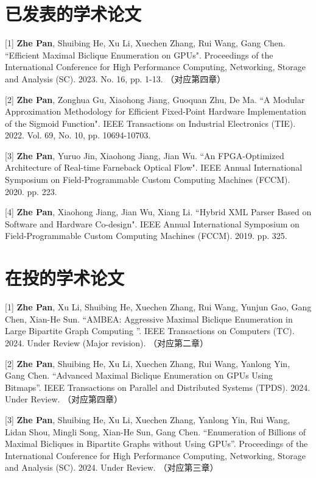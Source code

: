 \cleardoublepage
{}

\section*{已发表的学术论文}

[1] \textbf{Zhe Pan}, Shuibing He, Xu Li, Xuechen Zhang, Rui Wang, Gang Chen. ``Efficient Maximal Biclique Enumeration on GPUs". Proceedings of the International Conference for High Performance Computing, Networking, Storage and Analysis (SC). 2023. No. 16, pp. 1-13. （对应第四章）

[2] \textbf{Zhe Pan}, Zonghua Gu, Xiaohong Jiang, Guoquan Zhu, De Ma. ``A Modular Approximation Methodology for Efficient Fixed-Point Hardware Implementation of the Sigmoid Function". IEEE Transactions on Industrial Electronics (TIE). 2022. Vol. 69, No. 10, pp. 10694-10703.

\begin{sloppypar}
[3] \textbf{Zhe Pan}, Yuruo Jin, Xiaohong Jiang, Jian Wu. ``An FPGA-Optimized Architecture of Real-time Farneback Optical Flow". IEEE Annual International Symposium on Field-Programmable Custom Computing Machines (FCCM). 2020. pp. 223.
\end{sloppypar}


[4] \textbf{Zhe Pan}, Xiaohong Jiang, Jian Wu, Xiang Li. ``Hybrid XML Parser Based on Software and Hardware
Co-design". IEEE Annual International Symposium on Field-Programmable Custom Computing Machines (FCCM). 2019. pp. 325.

\section*{在投的学术论文}

[1] \textbf{Zhe Pan}, Xu Li, Shuibing He, Xuechen Zhang, Rui Wang, Yunjun Gao, Gang Chen, Xian-He Sun. ``AMBEA: Aggressive Maximal Biclique Enumeration in Large Bipartite Graph Computing ''. IEEE Transactions on Computers (TC). 2024. Under Review (Major revision). （对应第二章）

[2] \textbf{Zhe Pan}, Shuibing He, Xu Li, Xuechen Zhang, Rui Wang, Yanlong Yin, Gang Chen. ``Advanced Maximal Biclique Enumeration on GPUs Using Bitmaps''. IEEE Transactions on Parallel and Distributed Systems (TPDS). 2024. Under Review. （对应第四章）

[3] \textbf{Zhe Pan}, Shuibing He, Xu Li, Xuechen Zhang, Yanlong Yin, Rui Wang, Lidan Shou, Mingli Song, Xian-He Sun, Gang Chen. ``Enumeration of Billions of Maximal Bicliques in Bipartite Graphs without Using GPUs''. Proceedings of the International Conference for High Performance Computing, Networking, Storage and Analysis (SC). 2024. Under Review. （对应第三章）

